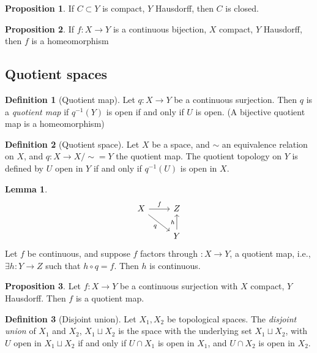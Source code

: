 \documentclass[a4paper,14pt]{extarticle}
\theoremstyle{definition}
\newtheorem*{definition}{Definition}
\newtheorem*{lemma}{Lemma}
\newtheorem*{proposition}{Proposition}
\begin{document}
\begin{proposition}
  If $C\subset Y$ is compact, $Y$ Hausdorff, then $C$ is closed.
\end{proposition}

\begin{proposition}
  If $f:X\rightarrow Y$ is a continuous bijection, $X$ compact, $Y$ Hausdorff, then $f$ 
  is a homeomorphism
\end{proposition}

\subsection{Quotient spaces}
\begin{definition}[Quotient map]
  Let $q:X\rightarrow Y$ be a continuous surjection. Then $q$ is a \emph{quotient map}
  if $q^{-1}(Y)$ is open if and only if $U$ is open. (A bijective quotient map is a 
  homeomorphism)
\end{definition}

\begin{definition}[Quotient space]
  Let $X$ be a space, and $\sim$ an equivalence relation on $X$, and 
  $q:X\rightarrow X/\sim = Y$ the quotient map. The quotient topology on $Y$ is defined by
  $U$ open in $Y$ if and only if $q^{-1}(U)$ is open in $X$.
\end{definition}

\begin{lemma}
  \[
  \begin{tikzcd}
    X \arrow{r}{f} \arrow[swap]{dr}{q} & Z  \\
     & Y \arrow{u}{h}
  \end{tikzcd}
\]
  Let $f$ be continuous, and suppose $f$ factors through $:X\rightarrow Y$, a quotient 
  map, i.e., $\exists h:Y\rightarrow Z$ such that $h\circ q = f$. Then $h$ is continuous.
\end{lemma}

\begin{proposition}
  Let $f:X\rightarrow Y$ be a continuous surjection with $X$ compact, $Y$ Hausdorff. Then 
  $f$ is a quotient map. 
\end{proposition}

\begin{definition}[Disjoint union]
  Let $X_1,X_2$ be topological spaces. The \emph{disjoint union} of $X_1$ and $X_2$,
  $X_1\sqcup X_2$ is the space with the underlying set $X_1\sqcup X_2$, with $U$ open 
  in $X_1\sqcup X_2$ if and only if $U\cap X_1$ is open in $X_1$, and $U\cap X_2$ is 
  open in $X_2$.
\end{definition}
\end{document}
